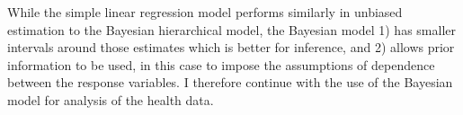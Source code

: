 While the simple linear regression model performs similarly in unbiased estimation to the Bayesian hierarchical model, the Bayesian model 1) has smaller intervals around those estimates which is better for inference, and 2) allows prior information to be used, in this case to impose the assumptions of dependence between the response variables. I therefore continue with the use of the Bayesian model for analysis of the health data.











